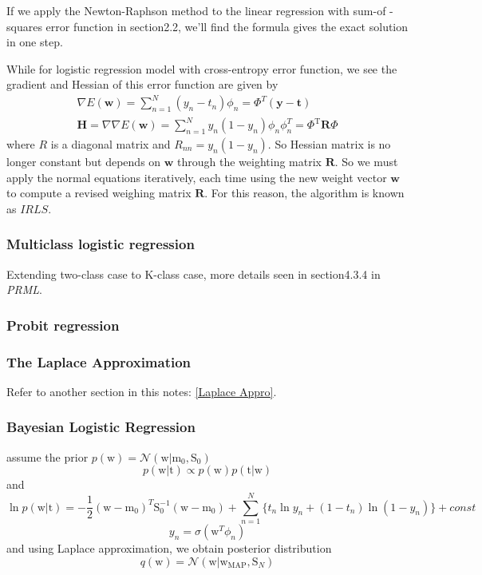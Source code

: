 \documentclass[a4paper]{book}
\newcommand{\mrm}{\mathrm}
\newcommand{\mbf}{\mathbf}
\newcommand{\RR}{\mbf R}
\newcommand{\ww}{\mbf w}
\newcommand{\ttt}{\mbf t}
\newcommand{\yy}{\mbf y}
\newcommand{\trans}{^{\mrm T}}
\begin{document}
If we apply the Newton-Raphson method  to the linear regression with sum-of -squares error function in section2.2, we'll find the formula gives the exact solution in one step. 

While for logistic regression model with cross-entropy error function, we see the gradient and Hessian of this error function are given by 
\begin{gather}\label{}
  \nabla E(\ww) = \sum_{n=1}^N(y_n-t_n)\phi_n = \Phi^T(\yy-\ttt) \\
  \mbf H=\nabla\nabla E(\ww) = \sum_{n=1}^Ny_n(1-y_n)\phi_n\phi_n^T = \Phi\trans \mbf R\Phi
\end{gather}
where $R$ is a diagonal matrix and $R_{nn} = y_n(1-y_n)$. So Hessian matrix is no longer constant but depends on $\ww$ through the weighting matrix $\RR$. So we must apply the normal equations iteratively, each time using the new weight vector $\ww$ to compute a revised weighing matrix $\RR$. For this reason, the algorithm is known as $IRLS$. 
\subsubsection*{Multiclass logistic regression}
Extending two-class case to K-class case, more  details seen in section4.3.4 in \textit{PRML}.
\subsubsection{Probit regression}



\subsubsection*{The Laplace Approximation}
Refer to another section in this notes: \ref{Laplace Appro}.
 
\subsubsection{Bayesian Logistic Regression}
assume the prior $p(\mathrm w) = \mathcal N(\mathrm w|\mathrm m_0,\mathrm S_0)$
$$p(\mathrm w|\mathrm t) \propto p(\mathrm w)p(\mathrm t|\mathrm w)$$
and
$$\ln p(\mathrm w|\mathrm t) = -\frac12(\mathrm w-\mathrm m_0)^T\mathrm S_0^{-1}(\mathrm w-\mathrm m_0)+\sum_{n=1}^N\{t_n\ln y_n +(1-t_n)\ln (1-y_n)\} + const$$
$$y_n = \sigma(\mathrm w^T\phi_n)$$
and using Laplace approximation, we obtain posterior distribution
$$q(\mathrm w) = \mathcal N(\mathrm w|\mathrm w_{\mathrm {MAP}}, \mathrm S_N)$$
\end{document}
